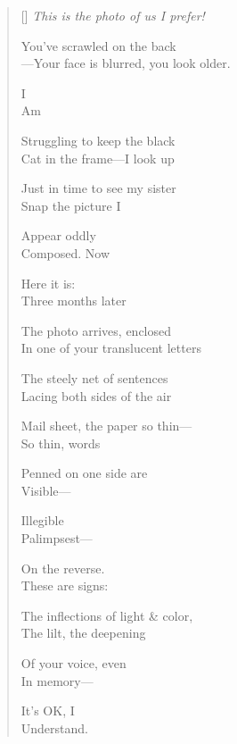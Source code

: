 \label{ch:letter}
\settowidth{\versewidth}{In one of your translucent letters}
\begin{verse}[\versewidth]
\textit{This is the photo of us I prefer!}

You've scrawled on the back\\
---Your face is blurred, you look older.    

\hspace*{3\vgap} I\\
Am

Struggling to keep the black\\
Cat in the frame---I look up

Just in time to see my sister\\
Snap \qquad the picture \qquad I

Appear oddly\\
Composed. \qquad Now

Here it is:\\
Three months later

The photo arrives, enclosed\\
In one of your translucent letters

The steely net of sentences\\
Lacing both sides of the air

Mail sheet, the paper so thin---\\
So thin, words

Penned on one side are\\
Visible---

Illegible\\
Palimpsest---

On the reverse.\\
These are signs:

The inflections of light \& color,\\
The lilt, the deepening

Of your voice, even\\
In memory---

It's OK, I\\
Understand.
\end{verse}
